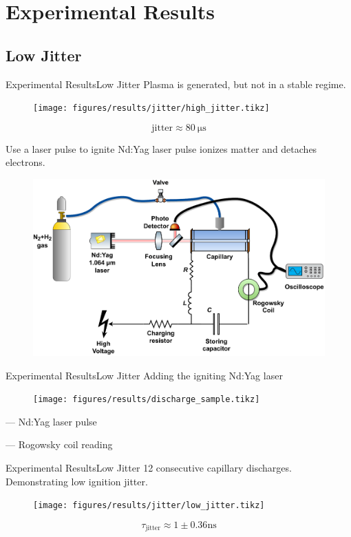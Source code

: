 \documentclass[dvipsnames]{beamer}
\begin{document}
\section{Experimental Results}
\subsection{Low Jitter}
\begin{frame}{Experimental Results}{Low Jitter}
Plasma is generated, but not in a stable regime.
\begin{figure}
 \texttt{[image: figures/results/jitter/high\_jitter.tikz]}
\end{figure}
$$\text{jitter}\approx \SI{80}{\us}$$
\end{frame}
\begin{frame}{Use a laser pulse to ignite}
    Nd:Yag laser pulse ionizes matter and detaches electrons.
\begin{figure}
    \centering
    \includegraphics[width=\textwidth]{figures/results/jitter/Laser_based_ignition_scheme.pdf}
\end{figure}
\end{frame}
\begin{frame}{Experimental Results}{Low Jitter}
Adding the igniting Nd:Yag laser
\begin{figure}
 \texttt{[image: figures/results/discharge\_sample.tikz]}
\end{figure}
 --- Nd:Yag laser pulse

 --- Rogowsky coil reading
\end{frame}
\begin{frame}{Experimental Results}{Low Jitter}
\small{12 consecutive capillary discharges. Demonstrating low ignition jitter.}
\begin{figure}
\texttt{[image: figures/results/jitter/low\_jitter.tikz]}
\end{figure}
$$\tau_\text{jitter}\approx 1\pm 0.36 \si{\ns}$$
\end{frame}
\end{document}
